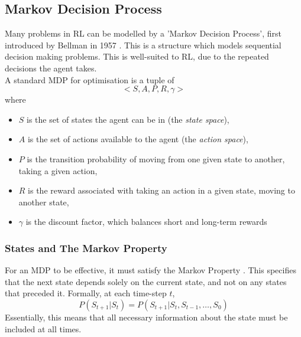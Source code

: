 \subsection{Markov Decision Process}
\label{sec:mdp}
Many problems in RL can be modelled by a 'Markov Decision Process', first introduced by Bellman in 1957 \cite{bellman1957markovian}. This is a structure which models sequential decision making problems. This is well-suited to RL, due to the repeated decisions the agent takes.\\ A standard MDP for optimisation is a tuple of
\[ <S, A, P, R, \gamma>\]
where
\begin{itemize}
    \item $S$ is the set of states the agent can be in (the \textit{state space}),
    \item $A$ is the set of actions available to the agent (the \textit{action space}),
    \item $P$ is the transition probability of moving from one given state to another, taking a given action,
    \item $R$ is the reward associated with taking an action in a given state, moving to another state,
    \item $\gamma$ is the discount factor, which balances short and long-term rewards
\end{itemize}
\subsubsection{States and The Markov Property}
For an MDP to be effective, it must satisfy the Markov Property \cite{puterman2014markov}. This specifies that the next state depends solely on the current state, and not on any states that preceded it. Formally, at each time-step $t$, $$P(S_{t+1} | S_t) = P(S_{t+1} | S_t, S_{t-1}, \ldots, S_0)$$ Essentially, this means that all necessary information about the state must be included at all times.
